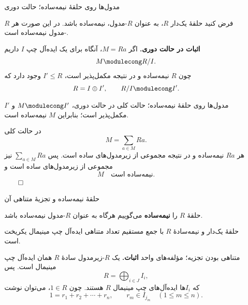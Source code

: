 \begin{frame}[t]{مدول‌ها روی حلقهٔ نیمه‌ساده؛ حالت دوری}
    \label{lec06:modules-over-semisimple-ring-cyclic}
    \begin{theorem}
        فرض کنید حلقهٔ یک‌دار \(R\)، به عنوان \(R\)-مدول، نیمه‌ساده باشد.
        در این صورت هر \(R\)-مدول نیمه‌ساده است.
    \end{theorem}
    \textbf{اثبات در حالت دوری.}
    اگر \(M=Ra\)، آنگاه برای یک ایده‌آل چپ \(I\) داریم
    \[
        M\modulecong R/I.
    \]
    چون \(R\) نیمه‌ساده و در نتیجه مکمل‌پذیر است، \(I'\leqslant R\) وجود دارد که
    \[
        R=I\oplus I',\qquad R/I\modulecong I'.
    \]
\end{frame}

\begin{frame}[t]{مدول‌ها روی حلقهٔ نیمه‌ساده؛ حالت کلی}
    \label{lec06:modules-over-semisimple-ring-general}
    در حالت دوری، \(M\modulecong I'\) و \(I'\) مکمل‌پذیر است؛
    بنابراین \(M\) نیمه‌ساده است.

    در حالت کلی
    \[
        M=\sum_{a\in M}Ra.
    \]
    هر \(Ra\) نیمه‌ساده و در نتیجه مجموعی از زیرمدول‌های ساده است.
    پس \(\sum_{a\in M}Ra\) نیز مجموعی از زیرمدول‌های ساده است و
    \[
        M\quad\text{نیمه‌ساده است.}
    \]
    \hfill\(\qed\)
\end{frame}

\begin{frame}[t]{حلقهٔ نیمه‌ساده و تجزیهٔ متناهی آن}
    \label{lec06:semisimple-ring-definition-decomposition}
    \begin{definition}
        حلقهٔ \(R\) را \textbf{نیمه‌ساده} می‌گوییم هرگاه به عنوان \(R\)-مدول نیمه‌ساده باشد.
    \end{definition}
    \begin{theorem}
        حلقهٔ یک‌دار و نیمه‌سادهٔ \(R\) با جمع مستقیم تعداد متناهی ایده‌آل چپ مینیمال یکریخت است.
    \end{theorem}
\end{frame}

\begin{frame}[t]{متناهی بودن تجزیه؛ مؤلفه‌های واحد}
    \label{lec06:finite-decomposition-unit}
    \textbf{اثبات.}
    یک \(R\)-زیرمدول سادهٔ \(R\) همان ایده‌آل چپ مینیمال است. پس
    \[
        R=\bigoplus_{i\in J}I_i,
    \]
    که \(I_i\)ها ایده‌آل‌های چپ مینیمال \(R\) هستند.
    چون \(1\in R\)، می‌توان نوشت
    \[
        1=r_1+r_2+\cdots+r_n,
        \qquad r_m\in I_{j_m}\quad(1\leqslant m\leqslant n).
    \]
\end{frame}

